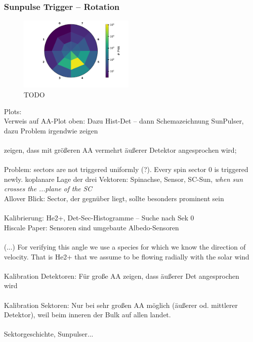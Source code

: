\subsubsection{Sunpulse Trigger -- Rotation}
\begin{figure}[h]
	\includegraphics[width=0.5\textwidth]{Figures/hist_det_sec_aa_90days2001}
	\centering
	\caption{TODO}
	\label{TODO}
\end{figure}
Plots: \\ 
Verweis auf AA-Plot oben: Dazu Hist-Det -- dann Schemazeichnung SunPulser, dazu Problem irgendwie zeigen
\\ \\
zeigen, dass mit größeren AA vermehrt äußerer Detektor angesprochen wird; 
\\ \\
Problem: sectors are not triggered uniformly (?). Every spin sector 0 is triggered newly. koplanare Lage der drei Vektoren: Spinachse, Sensor, SC-Sun, \textit{when sun crosses the ...plane of the SC}\\
Allover Blick: Sector, der gegnüber liegt, sollte besonders prominent sein
\\ \\
Kalibrierung: He2+, Det-Sec-Histogramme -- Suche nach Sek 0
\\ Hiscale Paper: Sensoren sind umgebaute Albedo-Sensoren
\\ \\
(...) For verifying this angle we use a species for which we know the direction of velocity. That is He2+ that we assume to be flowing radially with the solar wind
\\ \\
Kalibration Detektoren: Für große AA zeigen, dass äußerer Det angesprochen wird
\\ \\
Kalibration Sektoren: Nur bei sehr großen AA möglich (äußerer od. mittlerer Detektor), weil beim inneren der Bulk auf allen landet.
\\ \\
Sektorgeschichte, Sunpulser...

